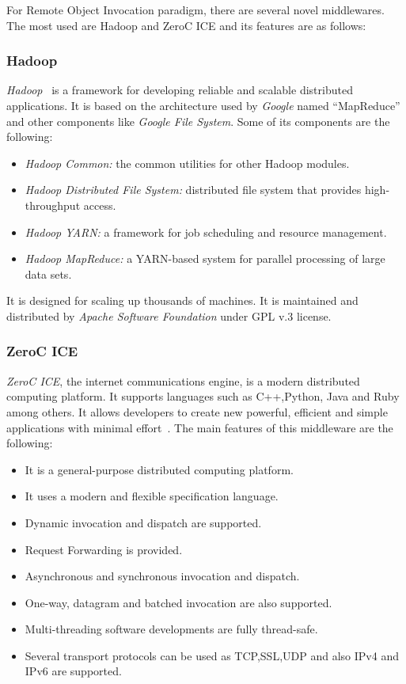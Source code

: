 For Remote Object Invocation paradigm, there are several novel middlewares. The most used are
Hadoop and ZeroC \ac{ICE} and its features are as follows:

\subsubsection{Hadoop}
\emph{Hadoop}~\cite{HADOOP} is a framework for developing  reliable and scalable
distributed applications. It is based on
the architecture used by \emph{Google} named ``MapReduce'' and other components
like \emph{Google File System}.
Some of its components are the following:
\begin{itemize}
\item \emph{Hadoop Common:} the common utilities for other Hadoop modules.
\item \emph{Hadoop Distributed File System:} distributed file system that
  provides high-throughput access.
\item \emph{Hadoop YARN:} a framework for job scheduling and resource management.
\item \emph{Hadoop MapReduce:} a YARN-based system for parallel processing of
  large data sets.
\end{itemize}
It is designed for scaling up thousands of machines. It
is maintained and distributed by \emph{Apache Software Foundation} under \ac{GPL} v.3
license.

\subsubsection{ZeroC ICE}
\emph{ZeroC \ac{ICE}}, the internet communications engine, is a modern distributed computing
platform. It supports languages such as C++,Python, Java and Ruby among others.
It allows developers to create new powerful, efficient and simple applications
with minimal effort~\cite{ZEROCICE}.
The main features of this middleware are the following:

\begin{itemize}
\item It is a general-purpose distributed computing platform.
\item It uses a modern and flexible specification language.
\item Dynamic invocation and dispatch are supported.
\item Request Forwarding is provided.
\item Asynchronous and synchronous invocation and dispatch.
\item One-way, datagram and batched invocation are also supported.
\item Multi-threading software developments are fully thread-safe.
\item Several transport protocols can be used as \ac{TCP},\ac{SSL},\ac{UDP} and also \ac{IP}v4 and
  \ac{IP}v6 are supported.
\end{itemize}

